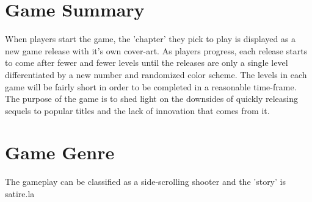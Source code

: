 \documentclass[11pt,fleqn]{book} %
\begin{document}
\section{Game Summary}

\quad When players start the game, the 'chapter' they pick to play is displayed as a new game release with it's own cover-art. As players progress, each release starts to come after fewer and fewer levels until the releases are only a single level differentiated by a new number and randomized color scheme. The levels in each game will be fairly short in order to be completed in a reasonable time-frame. The purpose of the game is to shed light on the downsides of quickly releasing sequels to popular titles and the lack of innovation that comes from it.
\vspace{-\baselineskip}

\section{Game Genre}

The gameplay can be classified as a side-scrolling shooter and the 'story' is satire.la
\end{document}
